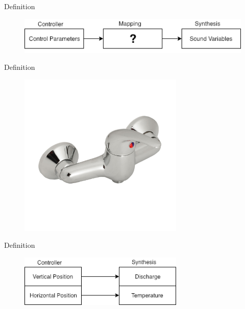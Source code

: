 \documentclass{beamer}
\begin{document}
\begin{frame}{Definition}
    \begin{figure}[h]
        \includegraphics[width=\textwidth]{mapping.png}
    \end{figure}
\end{frame}

\begin{frame}{Definition}
    \begin{figure}[h]
        \includegraphics[width=0.7\textwidth]{grifo1.jpg}
    \end{figure}
\end{frame}

\begin{frame}{Definition}
    \begin{figure}[h]
        \includegraphics[width=0.7\textwidth]{grifo1_scheme.png}
    \end{figure}
\end{frame}
\end{document}

